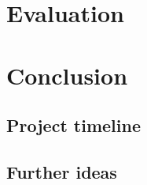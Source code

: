 \documentclass{easychair}
\begin{document}
\section{Evaluation}
\label{sect:Evaluation}


\section{Conclusion}
\label{sect:Conclusion}

\subsection{Project timeline}


\subsection{Further ideas}




%
\label{sect:bib}

%
%
%



\end{document}

